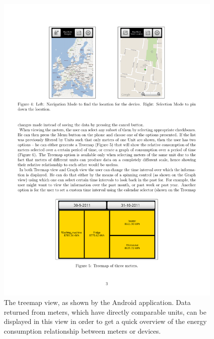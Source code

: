 \documentclass[10pt, conference, compsocconf, english]{IEEEtran}
\begin{document}
\begin{figure}[t]
\begin{centering}
\includegraphics[scale=0.78]{images/mobile-treemap} 
\par\end{centering}

\caption{The treemap view, as shown by the Android application. Data returned
from meters, which have directly comparable units, can be displayed
in this view in order to get a quick overview of the energy consumption
relationship between meters or devices.\label{fig:treemap-android}}
\end{figure}
\end{document}
